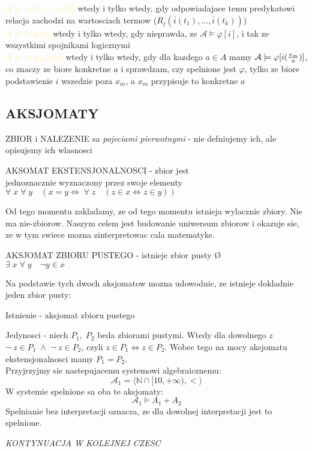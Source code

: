 \documentclass{article}
\newcommand{\N}{\mathbb{N}}
\begin{document}
  $\color{acc}\mathcal{A}\models r_j(t_1, ..., t_k)[i]$ wtedy i tylko wtedy, gdy odpowiadajace temu predykatowi relacja zachodzi na wartosciach termow ($R_j(\overline{i}(t_1), ..., \overline{i}(t_k))$)\smallskip\\
  $\color{acc}\mathcal{A}\models(\neg \varphi)[i]$ wtedy i tylko wtedy, gdy nieprawda, ze $\mathcal{A}\models\varphi[i]$, i tak ze \color{emp}wszystkimi spojnikami logicznymi\color{txt}\smallskip\\
  $\color{acc}\mathcal{A}\models(\forall\;x_m)\varphi[i]$ wtedy i tylko wtedy, gdy dla kazdego $a\in A$ mamy $\mathcal{A}\models\varphi[i({x_m\over a})]$, co znaczy ze biore konkretne $a$ i sprawdzam, czy spelnione jest $\varphi$, tylko ze biore podstawienie $i$ wszedzie poza $x_m$, a $x_m$ przypisuje to konkretne $a$  
\subsection*{AKSJOMATY}
  \color{def}ZBIOR \color{txt}i \color{def}NALEZENIE \color{txt}sa \color{emp}\emph{pojeciami pierwotnymi} \color{txt}- nie defniujemy ich, ale opisujemy ich wlasnosci
  \begin{center}
    \color{def}AKSOMAT EKSTENSJONALNOSCI \color{txt}- zbior jest \\jednoznacznie wyznaczony przez swoje elementy\smallskip\\
    $\forall\;x\;\forall\;y\quad (x=y \iff\;\forall\; z\quad (z\in x\iff z\in y))$
  \end{center}
  \color{acc}Od tego momentu zakladamy, ze od tego momentu istnieja wylacznie zbiory. \color{txt}Nie ma nie-zbiorow. Naszym celem jest budowanie uniwersum zbiorow i okazuje sie, ze w tym swiece mozna zinterpretowac cala matematyke.
  \begin{center}
    \color{def}AKSJOMAT ZBIORU PUSTEGO \color{txt}- istnieje zbior pusty \O\smallskip\\
    $\exists\;x\;\forall\;y\quad \neg y\in x$
  \end{center}
  Na podstawie tych dwoch aksjomatow mozna udowodnic, ze istnieje dokladnie jeden zbior pusty:\smallskip\par
    Istnienie - aksjomat zbioru pustego\par
    Jedynosci - niech $P_1,\;P_2$ beda zbiorami pustymi. Wtedy dla dowolnego $z$ $\neg\;z\in P_1\;\land\;\neg\;z\in P_2$, czyli $z\in P_1\iff z\in P_2$. Wobec tego na mocy aksjomatu ekstensjonalnosci mamy $P_1=P_2$.\bigskip\\
  Przyjrzyjmy sie nastepujacemu systemowi algebraicznemu:
  $$\mathcal{A}_1 =\langle \N\cap[10, +\infty), <\rangle$$
  W systemie spelnione sa oba te aksjomaty:
  $$\mathcal{A}_1\models A_1+A_2$$
  Spelnianie bez interpretacji oznacza, ze dla dowolnej interpretacji jest to spelnione.\\
  \begin{center}\color{emp}\emph{KONTYNUACJA W KOLEJNEJ CZESC}\end{center}
  
\end{document}
